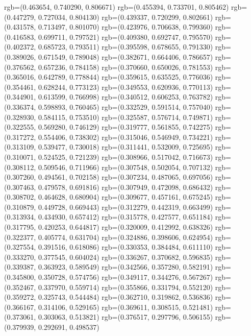 {{{					rgb=(0.463654, 0.740290, 0.806671)
					rgb=(0.455394, 0.733701, 0.805462)
					rgb=(0.447279, 0.727034, 0.804130)
					rgb=(0.439337, 0.720299, 0.802661)
					rgb=(0.431578, 0.713497, 0.801070)
					rgb=(0.423976, 0.706638, 0.799360)
					rgb=(0.416583, 0.699711, 0.797521)
					rgb=(0.409380, 0.692747, 0.795570)
					rgb=(0.402372, 0.685723, 0.793511)
					rgb=(0.395598, 0.678655, 0.791330)
					rgb=(0.389026, 0.671549, 0.789048)
					rgb=(0.382671, 0.664406, 0.786657)
					rgb=(0.376562, 0.657236, 0.784158)
					rgb=(0.370660, 0.650026, 0.781553)
					rgb=(0.365016, 0.642789, 0.778844)
					rgb=(0.359615, 0.635525, 0.776036)
					rgb=(0.354461, 0.628244, 0.773123)
					rgb=(0.349553, 0.620936, 0.770113)
					rgb=(0.344901, 0.613599, 0.766998)
					rgb=(0.340512, 0.606253, 0.763782)
					rgb=(0.336374, 0.598893, 0.760465)
					rgb=(0.332529, 0.591514, 0.757040)
					rgb=(0.328930, 0.584115, 0.753510)
					rgb=(0.325587, 0.576714, 0.749871)
					rgb=(0.322555, 0.569280, 0.746129)
					rgb=(0.319777, 0.561855, 0.742275)
					rgb=(0.317272, 0.554406, 0.738302)
					rgb=(0.315046, 0.546949, 0.734221)
					rgb=(0.313109, 0.539477, 0.730018)
					rgb=(0.311441, 0.532009, 0.725695)
					rgb=(0.310071, 0.524525, 0.721239)
					rgb=(0.308966, 0.517042, 0.716673)
					rgb=(0.308112, 0.509546, 0.711966)
					rgb=(0.307548, 0.502054, 0.707132)
					rgb=(0.307260, 0.494561, 0.702158)
					rgb=(0.307234, 0.487065, 0.697056)
					rgb=(0.307463, 0.479578, 0.691816)
					rgb=(0.307949, 0.472098, 0.686432)
					rgb=(0.308702, 0.464628, 0.680904)
					rgb=(0.309677, 0.457161, 0.675245)
					rgb=(0.310879, 0.449728, 0.669443)
					rgb=(0.312279, 0.442319, 0.663499)
					rgb=(0.313934, 0.434930, 0.657412)
					rgb=(0.315778, 0.427577, 0.651184)
					rgb=(0.317795, 0.420253, 0.644817)
					rgb=(0.320009, 0.412992, 0.638326)
					rgb=(0.322377, 0.405774, 0.631704)
					rgb=(0.324886, 0.398606, 0.624954)
					rgb=(0.327554, 0.391516, 0.618086)
					rgb=(0.330353, 0.384484, 0.611110)
					rgb=(0.333270, 0.377545, 0.604024)
					rgb=(0.336267, 0.370682, 0.596835)
					rgb=(0.339387, 0.363923, 0.589549)
					rgb=(0.342566, 0.357280, 0.582191)
					rgb=(0.345800, 0.350728, 0.574756)
					rgb=(0.349117, 0.344276, 0.567267)
					rgb=(0.352467, 0.337970, 0.559714)
					rgb=(0.355866, 0.331794, 0.552120)
					rgb=(0.359272, 0.325743, 0.544484)
					rgb=(0.362710, 0.319862, 0.536836)
					rgb=(0.366167, 0.314106, 0.529165)
					rgb=(0.369611, 0.308515, 0.521481)
					rgb=(0.373061, 0.303063, 0.513821)
					rgb=(0.376517, 0.297796, 0.506155)
					rgb=(0.379939, 0.292691, 0.498537)
}}}
